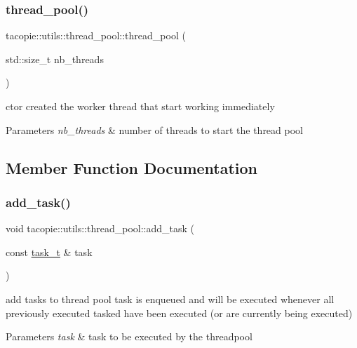 \subsubsection{\texorpdfstring{thread\+\_\+pool()}{thread\_pool()}}
{\footnotesize\ttfamily tacopie\+::utils\+::thread\+\_\+pool\+::thread\+\_\+pool (\begin{DoxyParamCaption}\item[{std\+::size\+\_\+t}]{nb\+\_\+threads }\end{DoxyParamCaption})\hspace{0.3cm}{\ttfamily [explicit]}}

ctor created the worker thread that start working immediately


\begin{DoxyParams}{Parameters}
{\em nb\+\_\+threads} & number of threads to start the thread pool \\
\hline
\end{DoxyParams}


\subsection{Member Function Documentation}
\mbox{\label{classtacopie_1_1utils_1_1thread__pool_a450bee2b7b2cd0aa0bc3935c8adc9ace}} 
\subsubsection{\texorpdfstring{add\+\_\+task()}{add\_task()}}
{\footnotesize\ttfamily void tacopie\+::utils\+::thread\+\_\+pool\+::add\+\_\+task (\begin{DoxyParamCaption}\item[{const \hyperlink{classtacopie_1_1utils_1_1thread__pool_a8ae8886fdeaa8e5c0abad12626a47296}{task\+\_\+t} \&}]{task }\end{DoxyParamCaption})}

add tasks to thread pool task is enqueued and will be executed whenever all previously executed tasked have been executed (or are currently being executed)


\begin{DoxyParams}{Parameters}
{\em task} & task to be executed by the threadpool \\
\hline
\end{DoxyParams}
\mbox{\label{classtacopie_1_1utils_1_1thread__pool_a77a647a75be188a5c5f83b922c061107}} 
